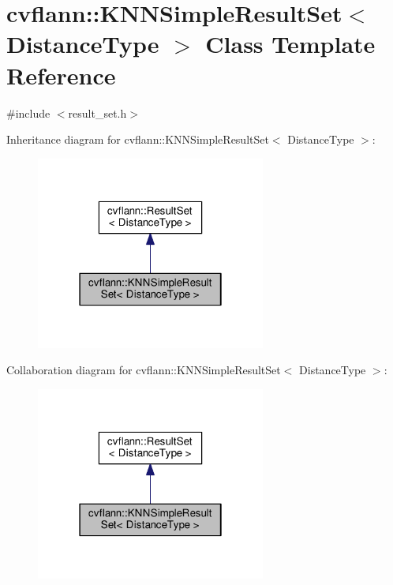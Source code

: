 \hypertarget{classcvflann_1_1KNNSimpleResultSet}{\section{cvflann\-:\-:K\-N\-N\-Simple\-Result\-Set$<$ Distance\-Type $>$ Class Template Reference}
\label{classcvflann_1_1KNNSimpleResultSet}
}


{\ttfamily \#include $<$result\-\_\-set.\-h$>$}



Inheritance diagram for cvflann\-:\-:K\-N\-N\-Simple\-Result\-Set$<$ Distance\-Type $>$\-:\nopagebreak
\begin{figure}[H]
\begin{center}
\leavevmode
\includegraphics[width=214pt]{classcvflann_1_1KNNSimpleResultSet__inherit__graph}
\end{center}
\end{figure}


Collaboration diagram for cvflann\-:\-:K\-N\-N\-Simple\-Result\-Set$<$ Distance\-Type $>$\-:\nopagebreak
\begin{figure}[H]
\begin{center}
\leavevmode
\includegraphics[width=214pt]{classcvflann_1_1KNNSimpleResultSet__coll__graph}
\end{center}
\end{figure}

